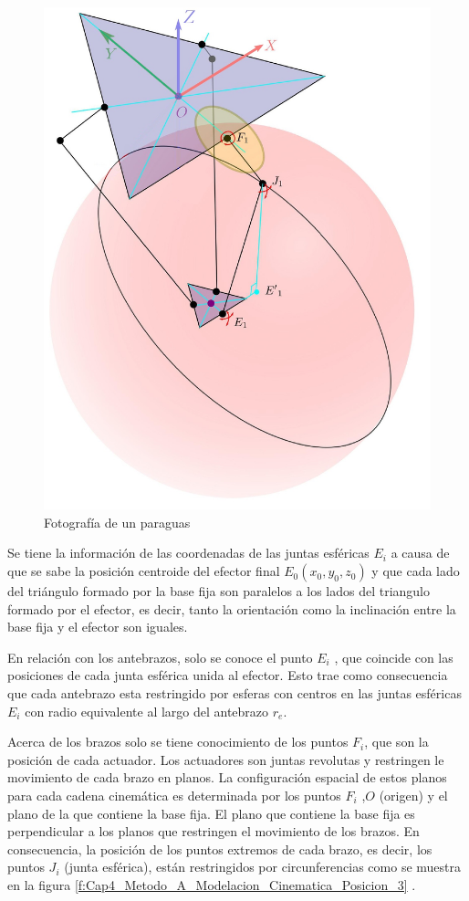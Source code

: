        
        \begin{figure}[htb]
             \centering
             \includegraphics[width=0.43\linewidth]{Main/Chapter4/Images4/DIBUJO6.jpg}
              \caption{Fotografía de un paraguas}
              \label{f:Cap4_Metodo_A_Modelacion_Cinematica_Posicion_4}
        \end{figure}
        
         Se tiene la informaci\'{o}n de las coordenadas de las juntas esf\'{e}ricas $E_i$ a causa de que se sabe la posici\'{o}n centroide del efector final $E_0(x_0,y_0,z_0)$ y que cada lado del tri\'{a}ngulo formado por la base fija son paralelos a los lados del triangulo formado por el efector, es decir, tanto la orientaci\'{o}n como la inclinaci\'{o}n entre la base fija y el efector son iguales.  

        En relaci\'{o}n con los antebrazos, solo se conoce el punto $E_i$ , que coincide con las posiciones de cada junta esf\'{e}rica unida al efector. Esto trae como consecuencia que cada antebrazo esta restringido por esferas con centros en las juntas esf\'{e}ricas $E_i$ con radio equivalente al largo del antebrazo $r_e$.
    
        Acerca de los brazos solo se tiene conocimiento de los puntos $F_i$, que son la posici\'{o}n de cada actuador. Los actuadores son juntas revolutas y restringen le movimiento de cada brazo en planos. La configuraci\'{o}n espacial de estos planos para cada cadena cinem\'{a}tica es determinada por los puntos $F_i$ ,$O$ (origen) y el plano de la que contiene la base fija. El plano que contiene la base fija es perpendicular a los planos que restringen el movimiento de los brazos. En consecuencia, la posici\'{o}n de los puntos extremos de cada brazo, es decir, los puntos $J_i$ (junta esf\'{e}rica), est\'{a}n restringidos por circunferencias como se muestra en la figura \ref{f:Cap4_Metodo_A_Modelacion_Cinematica_Posicion_3} .

